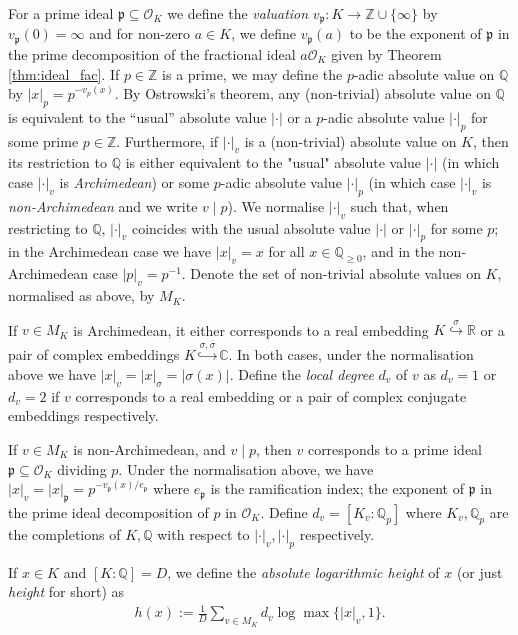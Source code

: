 \documentclass{theoretics}
\newcommand{\Q}{\mathbb{Q}}
\newcommand{\p}{\mathfrak{p}}
\newcommand{\Z}{\mathbb{Z}}
\renewcommand{\O}{\mathcal{O}}
\begin{document}
 For a prime ideal $\p \subseteq \O_K$ we define the \emph{valuation} $v_\p : K \to \Z \cup \{\infty\}$ by $v_\p(0) = \infty$ and for non-zero $a \in K$, we define $v_\p(a)$ to be the exponent of $\p$ in the prime decomposition of the fractional ideal $a\O_K$ given by Theorem \ref{thm:ideal_fac}. If $p \in \mathbb Z$ is a prime, we may define the $p$-adic absolute value on $\mathbb Q$ by $|x|_p = p^{-v_p(x)}$. By Ostrowski's theorem, any (non-trivial) absolute value on $\Q$ is equivalent to the ``usual'' absolute value $|\cdot|$ or a $p$-adic absolute value $|\cdot|_p$ for some prime $p \in \Z$. Furthermore, if $|\cdot|_v$ is a (non-trivial) absolute value on $K$, then its restriction to $\Q$ is either equivalent to the "usual" absolute value $|\cdot|$ (in which case $|\cdot|_v$ is \emph{Archimedean}) or some $p$-adic absolute value $|\cdot|_p$ (in which case $|\cdot|_v$ is \emph{non-Archimedean} and we write $v \mid p$). We normalise $|\cdot|_v$ such that, when restricting to $\Q$, $|\cdot|_v$ coincides with the usual absolute value $|\cdot|$ or $|\cdot|_p$ for some $p$; in the Archimedean case we have $|x|_v = x$ for all $x \in \Q_{\geq 0}$, and in the non-Archimedean case $|p|_v = p^{-1}$. Denote the set of non-trivial absolute values on $K$, normalised as above, by $M_K$.

If $v \in M_K$ is Archimedean, it either corresponds to a real embedding $K \overset{\sigma}\hookrightarrow \mathbb R$ or a pair of complex embeddings $K \overset{\sigma,\overline \sigma}\hookrightarrow \mathbb C$. In both cases, under the normalisation above we have $|x|_v = |x|_\sigma = |\sigma(x)|$. Define the \emph{local degree} $d_v$ of $v$ as $d_v = 1$ or $d_v = 2$ if $v$ corresponds to a real embedding or a pair of complex conjugate embeddings respectively.

If $v \in M_K$ is non-Archimedean, and $v \mid p$, then $v$ corresponds to a prime ideal $\p \subseteq \O_K$ dividing $p$. Under the normalisation above, we have $|x|_v = |x|_\p = p^{-v_\p(x)/e_\p}$ where $e_{\p}$ is the ramification index; the exponent of $\p$ in the prime ideal decomposition of $p$ in $\O_K$. Define $d_v = [K_v:\Q_p]$ where $K_v,\Q_p$ are the completions of $K, \Q$ with respect to $|\cdot|_v, |\cdot|_p$ respectively.

If $x \in K$ and $[K:\Q] = D$, we define the \emph{absolute logarithmic height} of $x$ (or just \emph{height} for short) as
\begin{align*}
    h(x) := \frac{1}{D} \sum_{v \in M_K} d_v \log \max\{|x|_v,1\}.
\end{align*}
\end{document}
